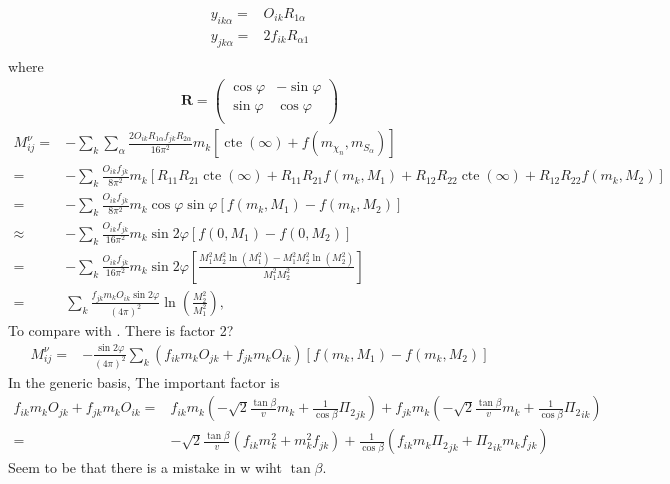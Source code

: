 \begin{align}
  y_{i k\alpha}=&O_{i k}R_{1\alpha} \nonumber\\
  y_{j k\alpha}=&2f_{i k}R_{\alpha 1} \nonumber\\
\end{align}
where
\begin{align}
  \mathbf{R}=
  \begin{pmatrix}
    \cos\varphi & -\sin\varphi\\
    \sin\varphi & \cos\varphi\\    
  \end{pmatrix}
\end{align}
\begin{align}
  M^{\nu}_{ij}=&-\sum_k \sum_{\alpha}
\frac{2O_{ik}R_{1\alpha}f_{jk} R_{2\alpha}}{16\pi^2}m_{k}\left[ \operatorname{cte}(\infty)+
f \left( m_{\chi_n},m_{S_{\alpha}} \right) \right] \nonumber\\
=&-\sum_k 
\frac{O_{ik}f_{jk} }{8\pi^2}m_{k}\left[ R_{11}R_{21}\operatorname{cte}(\infty)+
R_{11}R_{21}f \left( m_k,M_1 \right)
+R_{12}R_{22}\operatorname{cte}(\infty)+
R_{12}R_{22}f \left( m_k,M_2 \right) \right] \nonumber\\
=&-\sum_k \frac{O_{ik}f_{jk} }{8\pi^2}m_{k}\cos\varphi\sin\varphi
\left[f \left( m_k,M_1 \right)-f \left(m_k,M_2 \right) \right] \nonumber\\
\approx&-\sum_k \frac{O_{ik}f_{jk} }{16\pi^2}m_{k}\sin 2\varphi
\left[f \left( 0,M_1 \right)-f \left(0,M_2 \right) \right] \nonumber\\
=&-\sum_k \frac{O_{ik}f_{jk} }{16\pi^2}m_{k}\sin2\varphi
\left[\frac{M_1^2M_2^2\ln \left(M_1^2\right)-M_1^2M_2^2\ln \left(M_2^2\right)}{M_1^2M_2^2} \right] \nonumber\\
=&\sum_k \frac{f_{jk}m_kO_{ik} \sin2\varphi }{(4\pi)^2}
\ln \left( \frac{M_2^2}{M_1^2}\right),
\end{align}
To compare with \cite{AristizabalSierra:2006ri}. There is factor 2?
\begin{align}
  M^{\nu}_{ij} =&-\frac{\sin2\varphi}{\left(4\pi\right)^2}\sum_k \left( f_{ik}m_kO_{jk} +f_{jk}m_kO_{ik} \right)
\left[f \left( m_k,M_1 \right)-f \left(m_k,M_2 \right) \right]
\end{align}
In the generic basis, The important factor is
\begin{align}
\label{eq:gz}
  f_{ik}m_kO_{jk} +f_{jk}m_kO_{ik}=&
f_{ik}m_k \left(  -\sqrt{2}\frac{\tan\beta}{v}m_k+\frac{1}{\cos\beta}{\Pi_2}_{jk} \right)
+f_{jk}m_k\left( -\sqrt{2}\frac{\tan\beta}{v}m_k+\frac{1}{\cos\beta}{\Pi_2}_{ik} \right) \nonumber\\
=&
-\sqrt{2}\frac{\tan\beta}{v}\left(f_{ik}m_k^2+m_k^2f_{jk}\right)
 +\frac{1}{\cos\beta}\left(  f_{ik}m_k{\Pi_2}_{jk}+{\Pi_2}_{ik}m_kf_{jk} \right)
\end{align}
Seem to be that there is a mistake in \cite{hep-ph/0307172}w wiht $\tan\beta$.
